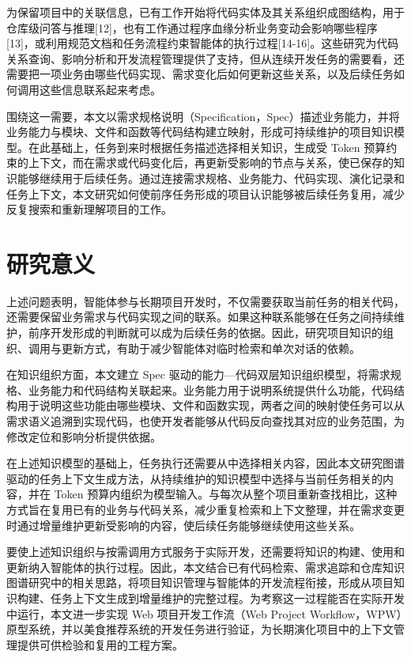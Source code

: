 为保留项目中的关联信息，已有工作开始将代码实体及其关系组织成图结构，用于仓库级问答与推理[12]，也有工作通过程序血缘分析业务变动会影响哪些程序[13]，或利用规范文档和任务流程约束智能体的执行过程[14-16]。这些研究为代码关系查询、影响分析和开发流程管理提供了支持，但从连续开发任务的需要看，还需要把一项业务由哪些代码实现、需求变化后如何更新这些关系，以及后续任务如何调用这些信息联系起来考虑。

围绕这一需要，本文以需求规格说明（Specification，Spec）描述业务能力，并将业务能力与模块、文件和函数等代码结构建立映射，形成可持续维护的项目知识模型。在此基础上，任务到来时根据任务描述选择相关知识，生成受 Token 预算约束的上下文，而在需求或代码变化后，再更新受影响的节点与关系，使已保存的知识能够继续用于后续任务。通过连接需求规格、业务能力、代码实现、演化记录和任务上下文，本文研究如何使前序任务形成的项目认识能够被后续任务复用，减少反复搜索和重新理解项目的工作。


\section{研究意义}
上述问题表明，智能体参与长期项目开发时，不仅需要获取当前任务的相关代码，还需要保留业务需求与代码实现之间的联系。如果这种联系能够在任务之间持续维护，前序开发形成的判断就可以成为后续任务的依据。因此，研究项目知识的组织、调用与更新方式，有助于减少智能体对临时检索和单次对话的依赖。

在知识组织方面，本文建立 Spec 驱动的能力—代码双层知识组织模型，将需求规格、业务能力和代码结构关联起来。业务能力用于说明系统提供什么功能，代码结构用于说明这些功能由哪些模块、文件和函数实现，两者之间的映射使任务可以从需求语义追溯到实现代码，也使开发者能够从代码反向查找其对应的业务范围，为修改定位和影响分析提供依据。

在上述知识模型的基础上，任务执行还需要从中选择相关内容，因此本文研究图谱驱动的任务上下文生成方法，从持续维护的知识模型中选择与当前任务相关的内容，并在 Token 预算内组织为模型输入。与每次从整个项目重新查找相比，这种方式旨在复用已有的业务与代码关系，减少重复检索和上下文整理，并在需求变更时通过增量维护更新受影响的内容，使后续任务能够继续使用这些关系。

要使上述知识组织与按需调用方式服务于实际开发，还需要将知识的构建、使用和更新纳入智能体的执行过程。因此，本文结合已有代码检索、需求追踪和仓库知识图谱研究中的相关思路，将项目知识管理与智能体的开发流程衔接，形成从项目知识构建、任务上下文生成到增量维护的完整过程。为考察这一过程能否在实际开发中运行，本文进一步实现 Web 项目开发工作流（Web Project Workflow，WPW）原型系统，并以美食推荐系统的开发任务进行验证，为长期演化项目中的上下文管理提供可供检验和复用的工程方案。


